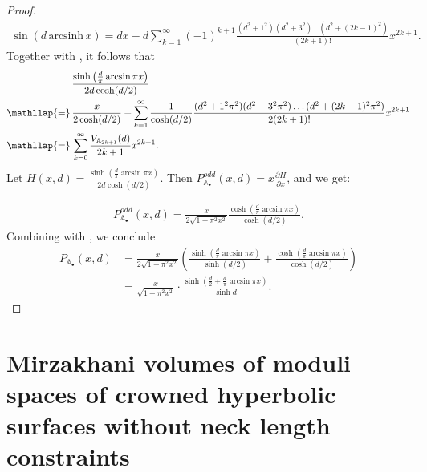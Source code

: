 \documentclass{amsart}
\theoremstyle{definition}
\begin{document}
\begin{proof}
\begin{align}
\sin (d \,\text{arcsinh}\, {x}) = dx - d\sum_{k=1}^\infty (-1)^{k+1} \frac{(d^2+1^2)(d^2+3^2)\dotsc(d^2+(2k-1)^2)}{(2k+1)!} x^{2k+1}.
\end{align}
Together with , it follows that
\[
\begin{aligned}
&\frac{\sinh \left(\frac{d}{\pi} \arcsin {\pi x}\right) }{2d\cosh(d/2)} \\
\smash{\mathllap{=}}\, &\frac{x}{2\cosh(d/2)} + \sum_{k=1}^\infty  \frac{1}{\cosh(d/2)}\frac{(d^2+1^2\pi^2)(d^2+3^2\pi^2)\dotsc(d^2+(2k-1)^2\pi^2)}{2(2k+1)!} x^{2k+1} \\
\smash{\mathllap{=}}\, &   \sum_{k=0}^\infty  
\frac{V_{\mathbb{A}_{2k+1}}(d)}{2k+1} x^{2k+1}.
\end{aligned}
\]
Let $H(x,d) = \frac{\sinh \left(\frac{d}{\pi} \arcsin {\pi x}\right) }{2d\cosh(d/2)}$. Then  $P_{\mathbb{A}_{\bullet}}^{odd}(x,d) = x \frac{\partial H}{\partial x} $, and we get:

\begin{align}
\label{eq: P odd}
P_{\mathbb{A}_{\bullet}}^{odd}(x,d) = \frac{x}{2\sqrt{1-\pi^2x^2}}  \frac{\cosh\left(\frac{d}{\pi} \arcsin {\pi x}\right)}{\cosh(d/2)}.    
\end{align}
Combining  with , we conclude
\begin{equation}
\begin{split}
P_{\mathbb{A}_{\bullet}}(x,d) &= \frac{x}{2\sqrt{1-\pi^2x^2}} \left( \frac{\sinh\left(\frac{d}{\pi} \arcsin {\pi x}\right)}{\sinh(d/2)}+\frac{\cosh\left(\frac{d}{\pi} \arcsin {\pi x}\right)}{\cosh(d/2)}\right) 
\\&
= \frac{x}{\sqrt{1-\pi^2x^2}} \cdot\frac{\sinh(\frac{d}{2}+\frac{d}{\pi}\arcsin\pi x)}{\sinh d}.   
\end{split}
\end{equation}

\end{proof}








\section{Mirzakhani volumes of moduli spaces of crowned hyperbolic surfaces without neck length constraints}
\end{document}
